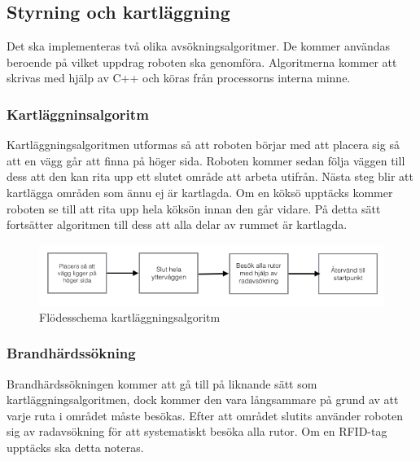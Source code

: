 \documentclass[a4paper,12pt,fleqn]{article}
\begin{document}
\subsection{Styrning och kartläggning}
Det ska implementeras två olika avsökningsalgoritmer. De kommer användas beroende på vilket uppdrag roboten ska genomföra. Algoritmerna kommer att skrivas med hjälp av C++ och köras från processorns interna minne. 

\subsubsection{Kartläggninsalgoritm}

Kartläggningsalgoritmen utformas så att roboten börjar med att placera sig så att en vägg går att finna på höger sida. Roboten kommer sedan följa väggen till dess att den kan rita upp ett slutet område att arbeta utifrån. Nästa steg blir att kartlägga områden som ännu ej är kartlagda. Om en köksö upptäcks kommer roboten se till att rita upp hela köksön innan den går vidare. På detta sätt fortsätter algoritmen till dess att alla delar av rummet är kartlagda. 

\begin{figure}[htp] %
  \begin{center}
  \includegraphics[keepaspectratio=true,scale=0.5]{flode_brandhard.jpg}  %
  \end{center}
  \caption{Flödesschema kartläggningsalgoritm} %
  \label{fig:map} %
\end{figure}
\newpage

\subsubsection{Brandhärdssökning}

Brandhärdssökningen kommer att gå till på liknande sätt som kartläggningsalgoritmen, dock kommer den vara långsammare på grund av att varje ruta i området måste besökas. Efter att området slutits använder roboten sig av radavsökning för att systematiskt besöka alla rutor. Om en RFID-tag upptäcks ska detta noteras.
\end{document}

